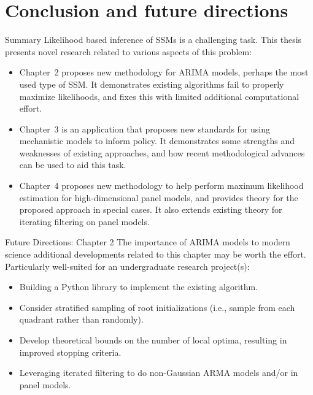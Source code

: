 \documentclass[aspectratio=169]{beamer}\usepackage[]{graphicx}\usepackage[]{xcolor}
\begin{document}
\section{Conclusion and future directions}

  \begin{frame}{Summary}
    Likelihood based inference of SSMs is a challenging task. This thesis presents novel research related to various aspects of this problem:
    \begin{itemize}
      \item Chapter~2 proposes new \alert{methodology} for ARIMA models, perhaps the most used type of SSM. It demonstrates existing algorithms fail to properly maximize likelihoods, and fixes this with limited additional computational effort. 
      \item Chapter~3 is an \alert{application} that proposes new standards for using mechanistic models to inform policy. It demonstrates some strengths and weaknesses of existing approaches, and how recent methodological advances can be used to aid this task. 
      \item Chapter~4 proposes new \alert{methodology} to help perform maximum likelihood estimation for high-dimensional panel models, and provides \alert{theory} for the proposed approach in special cases. It also extends existing theory for iterating filtering on panel models.
    \end{itemize}
  \end{frame}

  \begin{frame}{Future Directions: Chapter 2}
    The importance of ARIMA models to modern science additional developments related to this chapter may be worth the effort. Particularly well-suited for an undergraduate research project(s): 
    \begin{itemize}
      \item Building a Python library to implement the existing algorithm. 
      \item Consider stratified sampling of root initializations (i.e., sample from each quadrant rather than randomly).
      \item Develop theoretical bounds on the number of local optima, resulting in improved stopping criteria.
      \item Leveraging iterated filtering to do non-Gaussian ARMA models and/or in panel models.
    \end{itemize}
  \end{frame}
  
\end{document}
